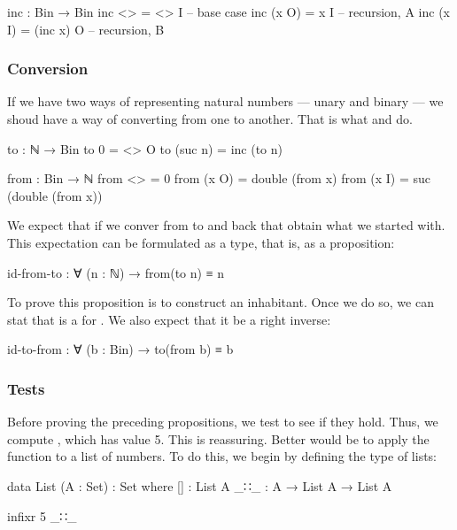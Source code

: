 \begin{colored}[elm]
inc : Bin → Bin
inc <> = <> I          -- base case
inc (x O) = x I        -- recursion, A
inc (x I) = (inc x) O  -- recursion, B
\end{colored}


\subsubsection{Conversion}

If we have two ways of representing natural numbers — unary and binary — we shoud have a way of converting from one to another.  That is what  and 
 do.

\begin{colored}[elm]
to : ℕ → Bin
to 0 = <> O
to (suc n) = inc (to n)

from : Bin → ℕ
from <> = 0
from (x O) = double (from x)
from (x I) = suc (double  (from x))
\end{colored}

We expect that if we conver from  to  and back that obtain what we started with.  This expectation can be formulated as a type, that is, as a proposition:

\begin{colored}[elm]
id-from-to : ∀ (n : ℕ) → from(to n) ≡ n
\end{colored}

To prove this proposition is to construct an inhabitant.  Once we do so, we can stat that  is a  for . We also expect that it be a right inverse:

\begin{colored}[elm]
id-to-from : ∀ (b : Bin) → to(from b) ≡ b
\end{colored}


\subsubsection{Tests}

Before proving the preceding propositions, we test to see if they hold.  Thus, we compute , which has value 5.  This is reassuring. Better would be to apply the function   to a list of numbers.  To do this, we begin by defining the type of lists:

\begin{colored}[elm]
data List (A : Set) : Set where
  []  : List A
  _∷_ : A → List A → List A

infixr 5 _∷_
\end{colored}


